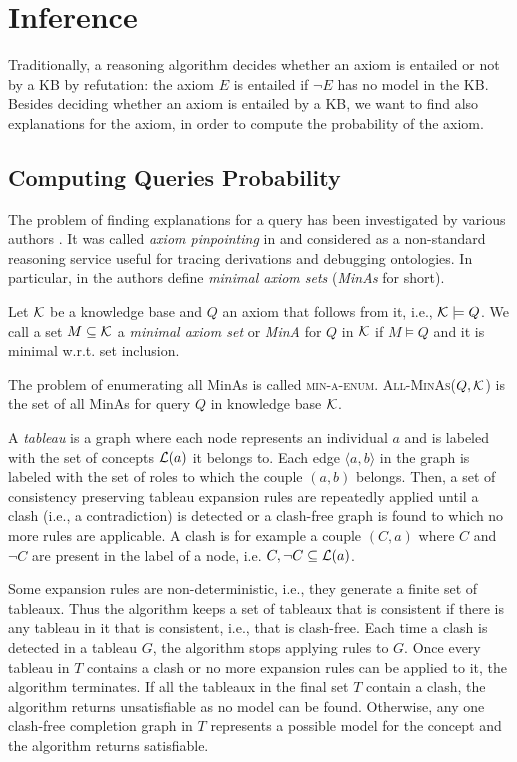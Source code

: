 \section{Inference}
\label{inf}

Traditionally, a reasoning algorithm decides  whether an axiom is entailed or not by a KB by refutation: the  axiom $E$ is entailed if $\neg E$ has no model
in the KB.
Besides deciding whether an axiom is entailed by a KB, we want to find also explanations for the axiom, in order to compute the probability of the axiom.

\subsection{Computing Queries Probability}
The problem of finding  explanations for a query
has been investigated by various authors \cite{DBLP:conf/ijcai/SchlobachC03,DBLP:journals/ws/KalyanpurPSH05,DBLP:conf/semweb/KalyanpurPHS07,Kalyanpurphd,extended_tracing,Zese17-SSW-BK}.
 It was called  \emph{axiom pinpointing} in 
\cite{DBLP:conf/ijcai/SchlobachC03}  and considered as a non-standard reasoning service useful for tracing derivations and debugging ontologies. 
In particular, in \cite{DBLP:conf/ijcai/SchlobachC03} the authors define \emph{minimal axiom sets}  (\emph{MinAs} for short).
\begin{definition}[MinA]
 Let ${\cal K}$ be a knowledge base and $Q$ an
axiom that follows from it, i.e., 
${\cal K} \models Q$. We call a set 
$M\subseteq {\cal K}$ a
\emph{minimal axiom set} or \emph{MinA} for $Q$ in ${\cal K}$ if 
$M \models Q$ and it is minimal
w.r.t. set inclusion.
\end{definition}  
\noindent The problem of enumerating all MinAs is called \textsc{min-a-enum}.
\textsc{All-MinAs($Q,{\cal K}$)} is the set of all MinAs for query $Q$ in knowledge base ${\cal K}$.

A \emph{tableau} is a graph where each node represents an
individual $a$ and is labeled with the set of concepts ${\cal L}(a)$ it belongs to. Each
edge $\langle a, b\rangle$ in the graph is labeled with the set of roles to which the couple
$(a, b)$ belongs. Then, a set of  consistency preserving tableau
expansion rules are repeatedly applied until a clash (i.e., a contradiction) is detected or a clash-free
graph is found to which no more rules are applicable. A clash is for example a
couple $(C, a)$ where $C$ and $\neg C$ are present in the label of a node, i.e. ${C, \neg C} \subseteq {\cal L}(a)$.

Some expansion rules are non-deterministic, i.e., they generate
a finite set of tableaux. Thus the algorithm keeps a set of tableaux that is
consistent if there is any tableau in it that is consistent, i.e., that is clash-free.
Each time a clash is detected in a tableau $G$, the algorithm stops applying rules
to $G$. Once every tableau in $T$ contains a clash or no more expansion rules
can be applied to it, the algorithm terminates. If all the tableaux in the final
set $T$ contain a clash, the algorithm returns unsatisfiable as no model can be
found. Otherwise, any one clash-free completion graph in $T$ represents a possible
model for the concept and the algorithm returns satisfiable.

